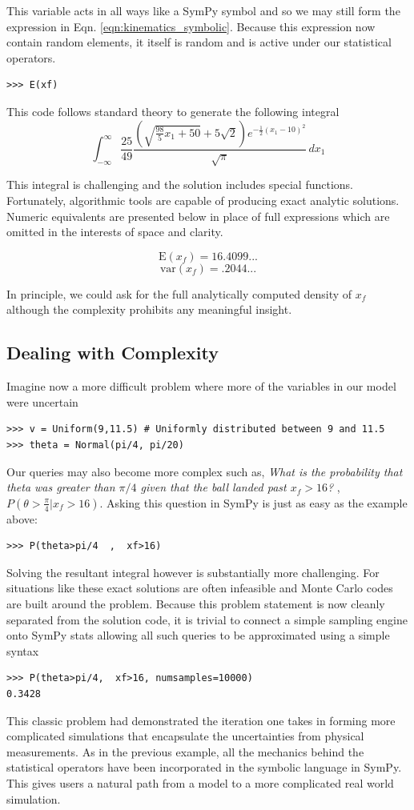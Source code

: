 This variable acts in all ways like a SymPy symbol and so we may still form the
expression in Eqn. \ref{eqn:kinematics_symbolic}. Because this expression now
contain random elements, it itself is random and is active under our
statistical operators.

\begin{lstlisting}
>>> E(xf)
\end{lstlisting}

This code follows standard theory to generate the following integral
$$\int_{-\infty}^{\infty} \frac{25}{49} \frac{\left(\sqrt{\frac{98}{5} x_{1} + 50} + 5 \sqrt{2}\right) e^{- \frac{1}{2} \left(x_{1} -10\right)^{2}}}{\sqrt{\pi}}\, dx_{1}$$

This integral is challenging and the solution includes special
functions. Fortunately, algorithmic tools are capable of producing exact
analytic solutions. Numeric equivalents are presented below in place of full
expressions which are omitted in the interests of space and clarity.

$$\textrm{E}(x_f) = 16.4099...$$
$$\textrm{var}(x_f) = .2044...$$

In principle, we could ask for the full analytically computed density of $x_f$
although the complexity prohibits any meaningful insight.

\subsection{Dealing with Complexity}

Imagine now a more difficult problem where more of the variables in our model were uncertain
\begin{lstlisting}
>>> v = Uniform(9,11.5) # Uniformly distributed between 9 and 11.5
>>> theta = Normal(pi/4, pi/20)
\end{lstlisting}

Our queries may also become more complex such as, \textit{What is the
probability that theta was greater than $\pi/4$ given that the ball landed
past $x_f>16$?} , $P(\theta>\frac{\pi}{4} | x_f>16)$. Asking this question in
SymPy is just as easy as the example above:
\begin{lstlisting}
>>> P(theta>pi/4  ,  xf>16)
\end{lstlisting}
Solving the resultant integral however is substantially more challenging. For
situations like these exact solutions are often infeasible and Monte Carlo
codes are built around the problem. Because this problem statement is now
cleanly separated from the solution code, it is trivial to connect a simple
sampling engine onto SymPy stats allowing all such queries to be approximated
using a simple syntax
\begin{lstlisting}
>>> P(theta>pi/4,  xf>16, numsamples=10000)
0.3428
\end{lstlisting}

This classic problem had demonstrated the iteration one takes in forming more
complicated simulations that encapsulate the uncertainties from physical
measurements. As in the previous example, all the mechanics behind the
statistical operators have been incorporated in the symbolic language in
SymPy.  This gives users a natural path from a model to a more complicated real
world simulation.
